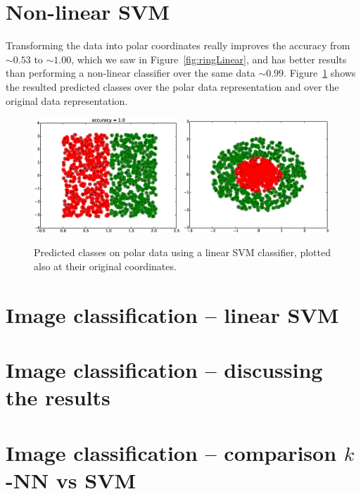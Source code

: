 \documentclass[a4paper,10pt]{article}
\begin{document}
\section{Non-linear SVM}
Transforming the data into polar coordinates really improves the accuracy from $\sim 0.53$ to $\sim 1.00$, which we saw in Figure~\ref{fig:ringLinear}, and has better results than performing a non-linear classifier over the same data $\sim 0.99$. Figure~\ref{fig:linearSVMonPolar} shows the resulted predicted classes over the polar data representation and over the original data representation.
\begin{figure}[ht!]
    \centering
    \includegraphics[width=0.49\textwidth]{linearSVMonPolar.eps}
    \includegraphics[width=0.49\textwidth]{final.eps}
    \caption{Predicted classes on polar data using a linear SVM classifier, plotted also at their original coordinates.}
    \label{fig:linearSVMonPolar}
\end{figure}

\section{Image classification -- linear SVM}

\section{Image classification -- discussing the results}

\section{Image classification -- comparison $k$-NN vs SVM}


%
%
\end{document}
